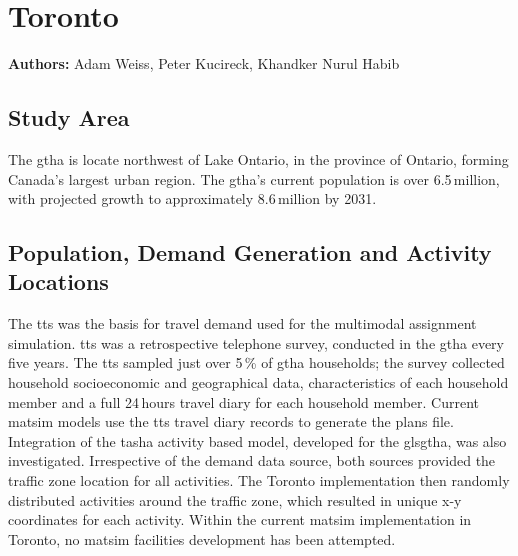 \chapter{Toronto}
\label{ch:toronto}
\hfill \textbf{Authors:} Adam Weiss, Peter Kucireck, Khandker Nurul Habib


\section{Study Area}
The \gls{gtha} is locate northwest of Lake Ontario, in the province of Ontario, forming Canada’s largest urban region. The \gls{gtha}’s current population is over 6.5\,million, with projected growth to approximately 8.6\,million by 2031. 

\section{Population, Demand Generation and Activity Locations}
The \gls{tts} was the basis for travel demand used for the \gls{multimodal} assignment simulation. \gls{tts} was a retrospective telephone survey, conducted in the \gls{gtha} every five years. The \gls{tts} sampled just over 5\,\% of \gls{gtha} households; the survey collected household socioeconomic and geographical data, characteristics of each household member and a full 24\,hours travel diary for each household member. Current \gls{matsim} models use the \gls{tts} travel diary records to generate the plans file. Integration of the \gls{tasha} activity based model, developed for the gls{gtha}, was also investigated. Irrespective of the demand data source, both sources provided the traffic zone location for all activities. The Toronto implementation then randomly distributed activities around the traffic zone, which resulted in unique x-y coordinates for each activity. Within the current \gls{matsim} implementation in Toronto, no \gls{matsim} facilities development has been attempted.


